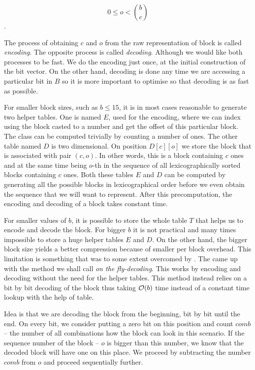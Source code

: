 				$$0 \leq o < {b\choose c}$$.

The process of obtaining $c$ and $o$ from the raw representation of block is called
\textit{encoding}. The opposite process is called \textit{decoding}. Although we would
like both processes to be fast. We do the encoding just once, at the initial construction
of the bit vector. On the other hand, decoding is done any time we are accessing a particular
bit in $B$ so it is more important to optimise so that decoding is as fast as possible.

For smaller block sizes, such as $b\leq 15$, it is in most cases reasonable to
generate two helper tables. One is named $E$, used for the encoding, where we can
index using the block casted to a number and get the offset of this particular block.
The class can be computed trivially by counting a number of ones. The other table
named $D$ is two dimensional. On position $D[c][o]$ we store the block that
is associated with pair $(c, o)$. In other words, this is a block containing $c$ ones
and at the same time being $o$-th in the sequence of all lexicographically sorted
blocks containing $c$ ones. Both these tables $E$ and $D$ can be computed
by generating all the possible blocks in lexicographical order before we even
obtain the sequence that we will want to represent. After this precomputation,
the encoding and decoding of a block takes constant time.

For smaller values of $b$, it is possible to store the whole table $T$ that helps us
to encode and decode the block. For bigger $b$ it is not practical and many times
impossible to store a huge helper tables $E$ and $D$. On the other hand, the bigger
block size yields a better compression because of smaller per block overhead. This limitation
is something that was to some extent overcomed by \cite{navarro2012fast}. The came up with the
method we shall call \textit{on the fly-decoding}. This works by encoding and decoding without
the need for the helper tables. This method instead relies on a bit by bit decoding of the block
thus taking $\mathcal{O}(b)$ time instead of a constant time lookup with the help of table.

Idea is that we are decoding the block from the beginning, bit by bit until the end. On every bit,
we consider putting a zero bit on this position and count $comb$ -- the number of all
combinations how the block can look in this scenario. If the sequence number of the block --
$o$ is bigger than this number, we know that the decoded block will have one on this place.
We proceed by subtracting the number $comb$ from $o$ and proceed sequentially further.

